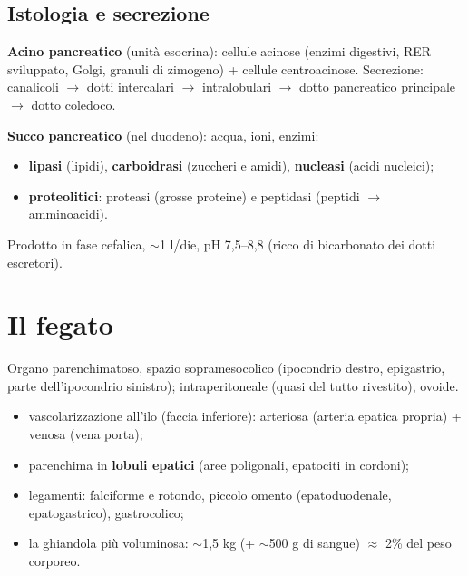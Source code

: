 \subsection{Istologia e secrezione}
\textbf{Acino pancreatico} (unità esocrina): cellule acinose (enzimi digestivi, RER sviluppato, Golgi,
granuli di zimogeno) + cellule centroacinose. Secrezione: canalicoli $\rightarrow$ dotti intercalari
$\rightarrow$ intralobulari $\rightarrow$ dotto pancreatico principale $\rightarrow$ dotto coledoco.

\textbf{Succo pancreatico} (nel duodeno): acqua, ioni, enzimi:
\begin{itemize}
  \item \textbf{lipasi} (lipidi), \textbf{carboidrasi} (zuccheri e amidi), \textbf{nucleasi} (acidi
    nucleici);
  \item \textbf{proteolitici}: proteasi (grosse proteine) e peptidasi (peptidi $\rightarrow$
    amminoacidi).
\end{itemize}
Prodotto in fase cefalica, $\sim$1 l/die, pH 7,5--8,8 (ricco di bicarbonato dei dotti escretori).

\section{Il fegato}

Organo parenchimatoso, spazio sopramesocolico (ipocondrio destro, epigastrio, parte dell'ipocondrio
sinistro); intraperitoneale (quasi del tutto rivestito), ovoide.
\begin{itemize}
  \item vascolarizzazione all'ilo (faccia inferiore): arteriosa (arteria epatica propria) + venosa
    (vena porta);
  \item parenchima in \textbf{lobuli epatici} (aree poligonali, epatociti in cordoni);
  \item legamenti: falciforme e rotondo, piccolo omento (epatoduodenale, epatogastrico), gastrocolico;
  \item la ghiandola più voluminosa: $\sim$1,5 kg (+ $\sim$500 g di sangue) $\approx$ 2\% del peso
    corporeo.
\end{itemize}

